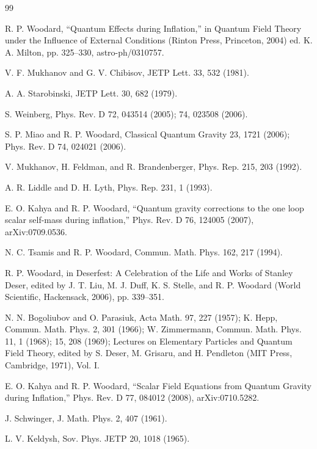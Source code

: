 \documentclass[aps,prd,onecolumn,10pt,nofootinbib,floatfix]{revtex4-2}
\begin{document}
\begin{thebibliography}{99}

R. P. Woodard, ``Quantum Effects during Inflation,'' in Quantum Field Theory under the Influence of External Conditions
(Rinton Press, Princeton, 2004) ed. K. A. Milton, pp. 325--330, astro-ph/0310757.

V. F. Mukhanov and G. V. Chibisov, JETP Lett. 33, 532 (1981).

A. A. Starobinski, JETP Lett. 30, 682 (1979).

S. Weinberg, Phys. Rev. D 72, 043514 (2005); 74, 023508 (2006).

S. P. Miao and R. P. Woodard, Classical Quantum Gravity 23, 1721 (2006); Phys. Rev. D 74, 024021 (2006).

V. Mukhanov, H. Feldman, and R. Brandenberger, Phys. Rep. 215, 203 (1992).

A. R. Liddle and D. H. Lyth, Phys. Rep. 231, 1 (1993).

E. O. Kahya and R. P. Woodard, ``Quantum gravity corrections to the one loop scalar self-mass during inflation,''
Phys. Rev. D 76, 124005 (2007), arXiv:0709.0536.

N. C. Tsamis and R. P. Woodard, Commun. Math. Phys. 162, 217 (1994).

R. P. Woodard, in Deserfest: A Celebration of the Life and Works of Stanley Deser, edited by J. T. Liu, M. J. Duff,
K. S. Stelle, and R. P. Woodard (World Scientific, Hackensack, 2006), pp. 339--351.

N. N. Bogoliubov and O. Parasiuk, Acta Math. 97, 227 (1957); K. Hepp, Commun. Math. Phys. 2, 301 (1966); W. Zimmermann,
Commun. Math. Phys. 11, 1 (1968); 15, 208 (1969); Lectures on Elementary Particles and Quantum Field Theory, edited by
S. Deser, M. Grisaru, and H. Pendleton (MIT Press, Cambridge, 1971), Vol. I.

E. O. Kahya and R. P. Woodard, ``Scalar Field Equations from Quantum Gravity during Inflation,'' Phys. Rev. D 77, 084012 (2008),
arXiv:0710.5282.

J. Schwinger, J. Math. Phys. 2, 407 (1961).

L. V. Keldysh, Sov. Phys. JETP 20, 1018 (1965).


\end{thebibliography}
\end{document}
